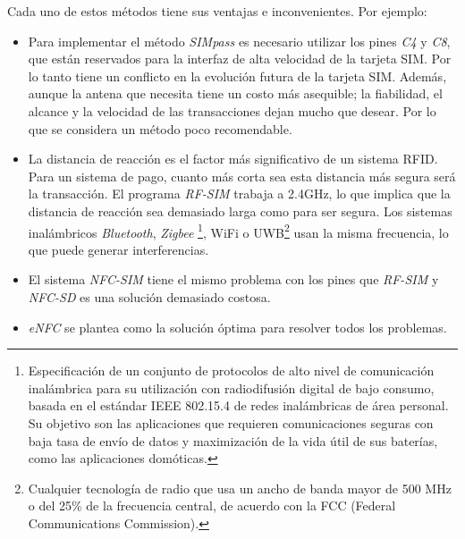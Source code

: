   Cada uno de estos métodos tiene sus ventajas e inconvenientes. Por ejemplo:
  \begin{itemize}
  \item Para implementar el método \emph{SIMpass} es necesario utilizar los
  pines \emph{C4} y \emph{C8}, que están reservados para la interfaz de alta
  velocidad de la tarjeta \acs{SIM}. Por lo tanto tiene un conflicto en la
  evolución futura de la tarjeta \acs{SIM}. Además, aunque la antena que
  necesita tiene un costo más asequible; la fiabilidad, el alcance y la
  velocidad de las transacciones dejan mucho que desear. Por lo que se 
  considera un método poco recomendable.
  \item La distancia de reacción es el factor más significativo de un sistema
  \acs{RFID}. Para un sistema de pago, cuanto más corta sea esta distancia
  más segura será la transacción. El programa \emph{RF-SIM} trabaja a 2.4GHz,
  lo que implica que la distancia de reacción sea demasiado larga como para ser
  segura. Los sistemas inalámbricos \emph{Bluetooth}, \emph{Zigbee}
  \footnote{Especificación de un conjunto de protocolos de alto nivel de 
  comunicación inalámbrica para su utilización con radiodifusión digital de 
  bajo consumo, basada en el estándar IEEE 802.15.4 de redes inalámbricas de 
  área personal. Su objetivo son las aplicaciones que requieren comunicaciones 
  seguras con baja tasa de envío de datos y maximización de la vida útil de 
  sus baterías, como las aplicaciones domóticas.},
  \acs{WiFi} o \acs{UWB}\footnote{Cualquier tecnología de radio que usa un
  ancho de banda mayor de 500 MHz o del 25\% de la frecuencia central, de 
  acuerdo con la FCC (Federal Communications Commission).} usan la misma 
  frecuencia, lo que puede generar interferencias.
  \item El sistema \emph{NFC-SIM} tiene el mismo problema con los pines que
  \emph{RF-SIM} y \emph{NFC-SD} es una solución demasiado costosa.
  \item \emph{eNFC} se plantea como la solución óptima para resolver todos los
  problemas.
  \end{itemize}

